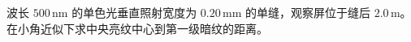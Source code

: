 波长 $500\,\mathrm{nm}$ 的单色光垂直照射宽度为 $0.20\,\mathrm{mm}$ 的单缝，观察屏位于缝后 $2.0\,\mathrm m$。在小角近似下求中央亮纹中心到第一级暗纹的距离。
